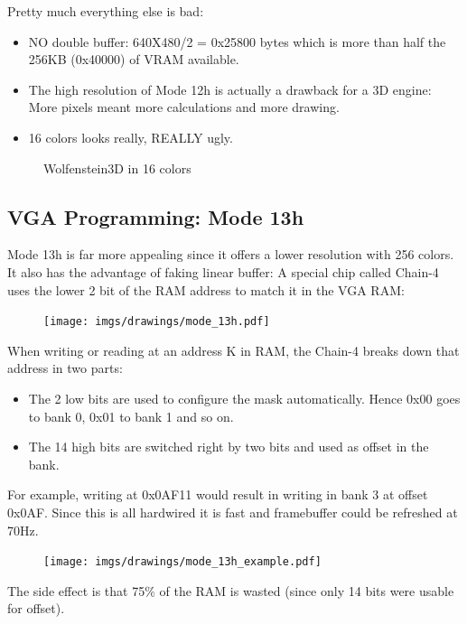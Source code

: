 \documentclass[book.tex]{subfiles}
\begin{document}
Pretty much everything else is bad:\\
\begin{itemize}
\item NO double buffer: 640X480/2 = 0x25800 bytes which is more than half the 256KB (0x40000) of VRAM available.
\item The high resolution of Mode 12h is actually a drawback for a 3D engine: More pixels meant more calculations and more drawing.
\item 16 colors looks really, REALLY ugly.
\end{itemize}

 \begin{figure}[H]
\centering
 \caption{Wolfenstein3D in 16 colors}
\end{figure}





 
  \subsection{VGA Programming: Mode 13h}
  Mode 13h is far more appealing since it offers a lower resolution with 256 colors. It also has the advantage of faking linear buffer: A special chip called Chain-4 uses the lower 2 bit of the RAM address to match it in the VGA RAM:\\
  \par
 \begin{figure}[H]
\centering
      \texttt{[image: imgs/drawings/mode\_13h.pdf]}
\end{figure}
\par

When writing or reading at an address K in RAM, the Chain-4 breaks down that address in two parts:
\begin{itemize}
\item The 2 low bits are used to configure the mask automatically. Hence 0x00 goes to bank 0, 0x01 to bank 1 and so on.
\item The 14 high bits are switched right by two bits and used as offset in the bank.
\end{itemize}
  \par
  For example, writing at 0x0AF11 would result in writing in bank 3 at offset 0x0AF. Since this is all hardwired it is fast and framebuffer could be refreshed at 70Hz.
 \begin{figure}[H]
\centering
      \texttt{[image: imgs/drawings/mode\_13h\_example.pdf]}
\end{figure}
\par
The side effect is that 75\% of the RAM is wasted (since only 14 bits were usable for offset).\\
\end{document}
